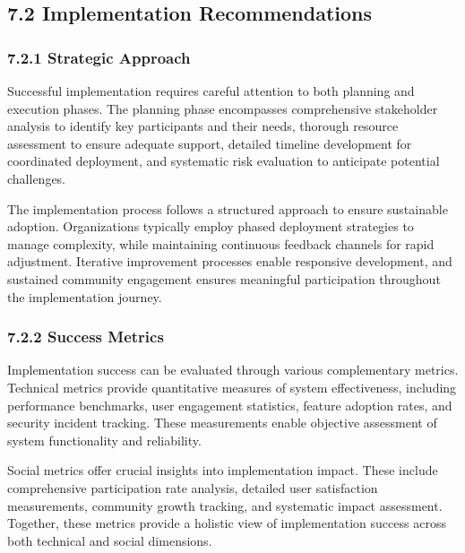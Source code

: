 \hypertarget{implementation-recommendations-1}{%
\subsection{7.2 Implementation Recommendations}\label{implementation-recommendations-1}}

\hypertarget{strategic-approach}{%
\subsubsection{7.2.1 Strategic Approach}\label{strategic-approach}}

Successful implementation requires careful attention to both planning and execution phases. The planning phase encompasses comprehensive stakeholder analysis to identify key participants and their needs, thorough resource assessment to ensure adequate support, detailed timeline development for coordinated deployment, and systematic risk evaluation to anticipate potential challenges.

The implementation process follows a structured approach to ensure sustainable adoption. Organizations typically employ phased deployment strategies to manage complexity, while maintaining continuous feedback channels for rapid adjustment. Iterative improvement processes enable responsive development, and sustained community engagement ensures meaningful participation throughout the implementation journey.

\hypertarget{success-metrics}{%
\subsubsection{7.2.2 Success Metrics}\label{success-metrics}}

Implementation success can be evaluated through various complementary metrics. Technical metrics provide quantitative measures of system effectiveness, including performance benchmarks, user engagement statistics, feature adoption rates, and security incident tracking. These measurements enable objective assessment of system functionality and reliability.

Social metrics offer crucial insights into implementation impact. These include comprehensive participation rate analysis, detailed user satisfaction measurements, community growth tracking, and systematic impact assessment. Together, these metrics provide a holistic view of implementation success across both technical and social dimensions.

